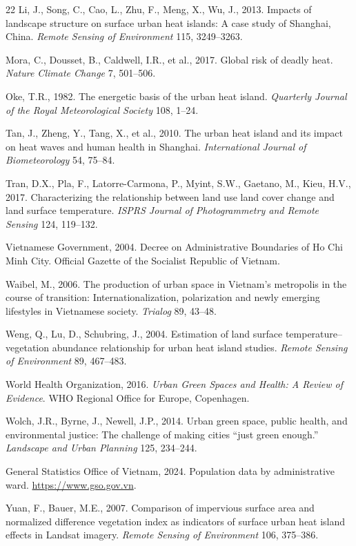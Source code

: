 \documentclass[preprint,12pt]{elsarticle}
\begin{document}
\begin{thebibliography}{22}
Li, J., Song, C., Cao, L., Zhu, F., Meng, X., Wu, J., 2013. Impacts of landscape structure on surface urban heat islands: A case study of Shanghai, China. \textit{Remote Sensing of Environment} 115, 3249--3263.

Mora, C., Dousset, B., Caldwell, I.R., et al., 2017. Global risk of deadly heat. \textit{Nature Climate Change} 7, 501--506.

Oke, T.R., 1982. The energetic basis of the urban heat island. \textit{Quarterly Journal of the Royal Meteorological Society} 108, 1--24.

Tan, J., Zheng, Y., Tang, X., et al., 2010. The urban heat island and its impact on heat waves and human health in Shanghai. \textit{International Journal of Biometeorology} 54, 75--84.

Tran, D.X., Pla, F., Latorre-Carmona, P., Myint, S.W., Gaetano, M., Kieu, H.V., 2017. Characterizing the relationship between land use land cover change and land surface temperature. \textit{ISPRS Journal of Photogrammetry and Remote Sensing} 124, 119--132.

Vietnamese Government, 2004. Decree on Administrative Boundaries of Ho Chi Minh City. Official Gazette of the Socialist Republic of Vietnam.

Waibel, M., 2006. The production of urban space in Vietnam's metropolis in the course of transition: Internationalization, polarization and newly emerging lifestyles in Vietnamese society. \textit{Trialog} 89, 43--48.

Weng, Q., Lu, D., Schubring, J., 2004. Estimation of land surface temperature--vegetation abundance relationship for urban heat island studies. \textit{Remote Sensing of Environment} 89, 467--483.

World Health Organization, 2016. \textit{Urban Green Spaces and Health: A Review of Evidence}. WHO Regional Office for Europe, Copenhagen.

Wolch, J.R., Byrne, J., Newell, J.P., 2014. Urban green space, public health, and environmental justice: The challenge of making cities ``just green enough.'' \textit{Landscape and Urban Planning} 125, 234--244.

General Statistics Office of Vietnam, 2024. Population data by administrative ward. \url{https://www.gso.gov.vn}.

Yuan, F., Bauer, M.E., 2007. Comparison of impervious surface area and normalized difference vegetation index as indicators of surface urban heat island effects in Landsat imagery. \textit{Remote Sensing of Environment} 106, 375--386.

\end{thebibliography}
\end{document}
